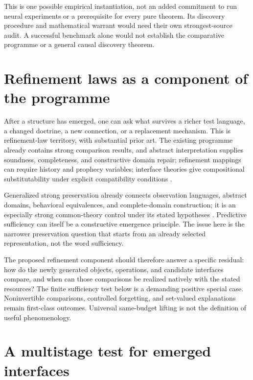 \documentclass[11pt]{article}
\theoremstyle{remark}
\begin{document}
This is one possible empirical instantiation, not an added commitment to run neural experiments or a prerequisite for every pure theorem. Its discovery procedure and mathematical warrant would need their own strongest-source audit. A successful benchmark alone would not establish the comparative programme or a general causal discovery theorem.

\section{Refinement laws as a component of the programme}
\label{sec:refinement-component}

After a structure has emerged, one can ask what survives a richer test language, a changed doctrine, a new connection, or a replacement mechanism. This is refinement-law territory, with substantial prior art. The existing programme already contains strong comparison results, and abstract interpretation supplies soundness, completeness, and constructive domain repair; refinement mappings can require history and prophecy variables; interface theories give compositional substitutability under explicit compatibility conditions \cite{AbstractCompletion,RefinementMappings,InterfaceAutomata}.

Generalized strong preservation already connects observation languages, abstract domains, behavioral equivalences, and complete-domain construction; it is an especially strong common-theory control under its stated hypotheses \cite{StrongPreservation}. Predictive sufficiency can itself be a constructive emergence principle. The issue here is the narrower preservation question that starts from an already selected representation, not the word sufficiency.

The proposed refinement component should therefore answer a specific residual: how do the newly generated objects, operations, and candidate interfaces compare, and when can those comparisons be realized natively with the stated resources? The finite sufficiency test below is a demanding positive special case. Noninvertible comparisons, controlled forgetting, and set-valued explanations remain first-class outcomes. Universal same-budget lifting is not the definition of useful phenomenology.

\section{A multistage test for emerged interfaces}
\label{sec:multistage}
\end{document}

